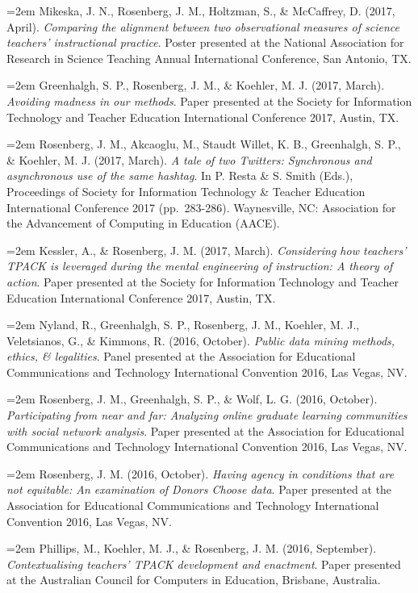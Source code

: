 \documentclass[
  11pt,
]{article}
\begin{document}
\hangindent=2em Mikeska, J. N., Rosenberg, J. M., Holtzman, S., \&
McCaffrey, D. (2017, April). \emph{Comparing the alignment between two
observational measures of science teachers' instructional practice}.
Poster presented at the National Association for Research in Science
Teaching Annual International Conference, San Antonio, TX.

\hangindent=2em Greenhalgh, S. P., Rosenberg, J. M., \& Koehler, M. J.
(2017, March). \emph{Avoiding madness in our methods}. Paper presented
at the Society for Information Technology and Teacher Education
International Conference 2017, Austin, TX.

\hangindent=2em Rosenberg, J. M., Akcaoglu, M., Staudt Willet, K. B.,
Greenhalgh, S. P., \& Koehler, M. J. (2017, March). \emph{A tale of two
Twitters: Synchronous and asynchronous use of the same hashtag}. In P.
Resta \& S. Smith (Eds.), Proceedings of Society for Information
Technology \& Teacher Education International Conference 2017
(pp.~283-286). Waynesville, NC: Association for the Advancement of
Computing in Education (AACE).

\hangindent=2em Kessler, A., \& Rosenberg, J. M. (2017, March).
\emph{Considering how teachers' TPACK is leveraged during the mental
engineering of instruction: A theory of action}. Paper presented at the
Society for Information Technology and Teacher Education International
Conference 2017, Austin, TX.

\hangindent=2em Nyland, R., Greenhalgh, S. P., Rosenberg, J. M.,
Koehler, M. J., Veletsianos, G., \& Kimmons, R. (2016, October).
\emph{Public data mining methods, ethics, \& legalities}. Panel
presented at the Association for Educational Communications and
Technology International Convention 2016, Las Vegas, NV.

\hangindent=2em Rosenberg, J. M., Greenhalgh, S. P., \& Wolf, L. G.
(2016, October). \emph{Participating from near and far: Analyzing online
graduate learning communities with social network analysis}. Paper
presented at the Association for Educational Communications and
Technology International Convention 2016, Las Vegas, NV.

\hangindent=2em Rosenberg, J. M. (2016, October). \emph{Having agency in
conditions that are not equitable: An examination of Donors Choose
data}. Paper presented at the Association for Educational Communications
and Technology International Convention 2016, Las Vegas, NV.

\hangindent=2em Phillips, M., Koehler, M. J., \& Rosenberg, J. M. (2016,
September). \emph{Contextualising teachers' TPACK development and
enactment}. Paper presented at the Australian Council for Computers in
Education, Brisbane, Australia.
\end{document}
